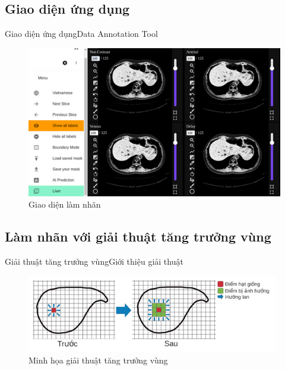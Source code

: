 \documentclass[
	10pt,                %
	aspectratio=169,     %
]{beamer}
\begin{document}
\subsection{Giao diện ứng dụng}
    \begin{frame}{Giao diện ứng dụng}{Data Annotation Tool}
		\begin{figure}
			\centering
			\includegraphics[width=0.78\linewidth]{Presentation_template/figures/DAT/dat_slide_user_ui.png}
			\caption{Giao diện làm nhãn}
		\end{figure}
	\end{frame}

\subsection{Làm nhãn với giải thuật tăng trưởng vùng}

\begin{frame}{Giải thuật tăng trưởng vùng}{Giới thiệu giải thuật}
		
		\begin{figure}[h!]
    	     \includegraphics[width=0.98\textwidth]{Presentation_template/figures/DAT/dat_slide_region_growing_latest.pdf}
				\caption{Minh họa giải thuật tăng trưởng vùng}
		\end{figure}
\end{frame}
\end{document}
